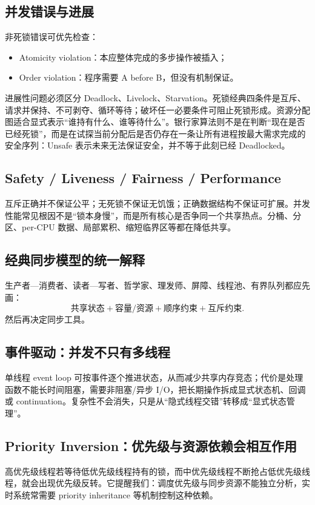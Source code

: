 \documentclass[11pt,a4paper,openany]{ctexbook}
\begin{document}
\subsection{并发错误与进展}
非死锁错误可优先检查：
\begin{itemize}
  \item Atomicity violation：本应整体完成的多步操作被插入；
  \item Order violation：程序需要 A before B，但没有机制保证。
\end{itemize}
进展性问题必须区分 Deadlock、Livelock、Starvation。死锁经典四条件是互斥、请求并保持、不可剥夺、循环等待；破坏任一必要条件可阻止死锁形成。资源分配图适合显式表示“谁持有什么、谁等待什么”。银行家算法则不是在判断“现在是否已经死锁”，而是在试探当前分配后是否仍存在一条让所有进程按最大需求完成的安全序列：Unsafe 表示未来无法保证安全，并不等于此刻已经 Deadlocked。

\subsection{Safety / Liveness / Fairness / Performance}
互斥正确并不保证公平；无死锁不保证无饥饿；正确数据结构不保证可扩展。并发性能常见根因不是“锁本身慢”，而是所有核心是否争同一个共享热点。分桶、分区、per-CPU 数据、局部累积、缩短临界区等都在降低共享。

\subsection{经典同步模型的统一解释}
生产者—消费者、读者—写者、哲学家、理发师、屏障、线程池、有界队列都应先画：
\[
\text{共享状态}+\text{容量/资源}+\text{顺序约束}+\text{互斥约束}.
\]
然后再决定同步工具。


\subsection{事件驱动：并发不只有多线程}
单线程 event loop 可按事件逐个推进状态，从而减少共享内存竞态；代价是处理函数不能长时间阻塞，需要非阻塞/异步 I/O，把长期操作拆成显式状态机、回调或 continuation。复杂性不会消失，只是从“隐式线程交错”转移成“显式状态管理”。

\subsection{Priority Inversion：优先级与资源依赖会相互作用}
高优先级线程若等待低优先级线程持有的锁，而中优先级线程不断抢占低优先级线程，就会出现优先级反转。它提醒我们：调度优先级与同步资源不能独立分析，实时系统常需要 priority inheritance 等机制控制这种依赖。
\end{document}
